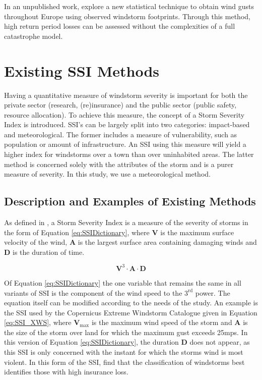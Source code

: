         In an unpublished work, \cite{Priestley2023} explore a new statistical technique to obtain wind gusts throughout Europe using observed windstorm footprints. Through this method, high return period losses can be assessed without the complexities of a full catastrophe model.


\section{Existing SSI Methods}
    
    Having a quantitative measure of windstorm severity is important for both the private sector (research, (re)insurance) and the public sector (public safety, resource allocation). To achieve this measure, the concept of a Storm Severity Index is introduced. SSI's can be largely split into two categories: impact-based and meteorological. The former includes a measure of vulnerability, such as population or amount of infrastructure. An SSI using this measure will yield a higher index for windstorms over a town than over uninhabited areas. The latter method is concerned solely with the attributes of the storm and is a purer measure of severity. In this study, we use a meteorological method.

    \subsection{Description and Examples of Existing Methods}

        As defined in \cite{ADictionaryofWeather}, a Storm Severity Index is a measure of the severity of storms in the form of Equation \ref{eq:SSIDictionary}, where $\mathbf{V}$ is the maximum surface velocity of the wind, $\mathbf{A}$ is the largest surface area containing damaging winds and $\mathbf{D}$ is the duration of time.

        \begin{equation}
            \label{eq:SSIDictionary}
            \mathbf{V}^3 \cdot \mathbf{A} \cdot \mathbf{D}
        \end{equation}

        Of Equation \ref{eq:SSIDictionary} the one variable that remains the same in all variants of SSI is the component of the wind speed to the $3^{\text{rd}}$ power. The equation itself can be modified according to the needs of the study. An example is the SSI used by the Copernicus Extreme Windstorm Catalogue given in Equation \ref{eq:SSI_XWS}, where $\mathbf{V}_{\text{max}}$ is the maximum wind speed of the storm and $\mathbf{A}$ is the size of the storm over land for which the maximum gust exceeds 25mps. In this version of Equation \ref{eq:SSIDictionary}, the duration $\mathbf{D}$ does not appear, as this SSI is only concerned with the instant for which the storms wind is most violent. In this form of the SSI, \cite{XWS-nhess-14-2487-2014} find that the classification of windstorms best identifies those with high insurance loss.

